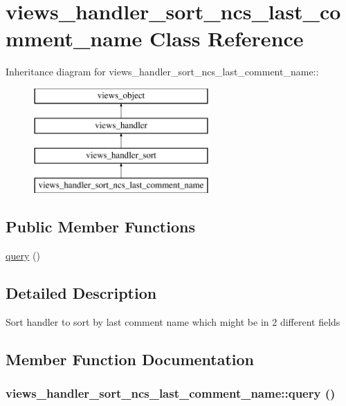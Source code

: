 \hypertarget{classviews__handler__sort__ncs__last__comment__name}{
\section{views\_\-handler\_\-sort\_\-ncs\_\-last\_\-comment\_\-name Class Reference}
\label{classviews__handler__sort__ncs__last__comment__name}
}
Inheritance diagram for views\_\-handler\_\-sort\_\-ncs\_\-last\_\-comment\_\-name::\begin{figure}[H]
\begin{center}
\leavevmode
\includegraphics[height=4cm]{classviews__handler__sort__ncs__last__comment__name}
\end{center}
\end{figure}
\subsection*{Public Member Functions}
\begin{CompactItemize}
\item 
\hyperlink{classviews__handler__sort__ncs__last__comment__name_23a0eb15347f118155df094a2cadd249}{query} ()
\end{CompactItemize}


\subsection{Detailed Description}
Sort handler to sort by last comment name which might be in 2 different fields 

\subsection{Member Function Documentation}
\hypertarget{classviews__handler__sort__ncs__last__comment__name_23a0eb15347f118155df094a2cadd249}{
\subsubsection[{query}]{\setlength{\rightskip}{0pt plus 5cm}views\_\-handler\_\-sort\_\-ncs\_\-last\_\-comment\_\-name::query ()}}
\label{classviews__handler__sort__ncs__last__comment__name_23a0eb15347f118155df094a2cadd249}


